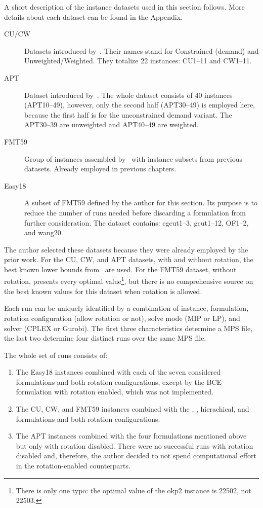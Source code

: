 A short description of the instance datasets used in this section follows.
More details about each dataset can be found in the Appendix.

\begin{description}
	\item [CU/CW] Datasets introduced by~\citet{fayard:1998}. Their names stand for Constrained (demand) and Unweighted/Weighted. They totalize 22 instances: CU1--11 and CW1--11.
	\item [APT] Dataset introduced by~\citet{alvarez:2002:tabu}. The whole dataset consists of 40 instances (APT10--49), however, only the second half (APT30--49) is employed here, because the first half is for the unconstrained demand variant. The APT30--39 are unweighted and APT40--49 are weighted.
	\item [FMT59] Group of instances assembled by~\cite{furini:2016} with instance subsets from previous datasets. Already employed in previous chapters.
	\item [Easy18] A subset of FMT59 defined by the author for this section. Its purpose is to reduce the number of runs needed before discarding a formulation from further consideration. The dataset contains: cgcut1--3, gcut1--12, OF1--2, and wang20.
\end{description}

The author selected these datasets because they were already employed by the prior work.
For the CU, CW, and APT datasets, with and without rotation, the best known lower bounds from~\citet{velasco:2019} are used.
For the FMT59 dataset, without rotation, \citet{furini:2016} presents every optimal value\footnote{There is only one typo: the optimal value of the okp2 instance is 22502, not 22503.}, but there is no comprehensive source on the best known values for this dataset when rotation is allowed.

Each run can be uniquely identified by a combination of instance, formulation, rotation configuration (allow rotation or not), solve mode (MIP or LP), and solver (CPLEX or Gurobi).
The first three characteristics determine a MPS file, the last two determine four distinct runs over the same MPS file.

The whole set of runs consists of:
\begin{enumerate}
\item The Easy18 instances combined with each of the seven considered formulations and both rotation configurations, except by the BCE formulation with rotation enabled, which was not implemented.
\item The CU, CW, and FMT59 instances combined with the {\modelBecker}, {\modelOrigami}, hierachical, and {\modelImplicit} formulations and both rotation configurations.
\item The APT instances combined with the four formulations mentioned above but only with rotation disabled. There were no successful runs with rotation disabled and, therefore, the author decided to not spend computational effort in the rotation-enabled counterparts. %
\end{enumerate}

